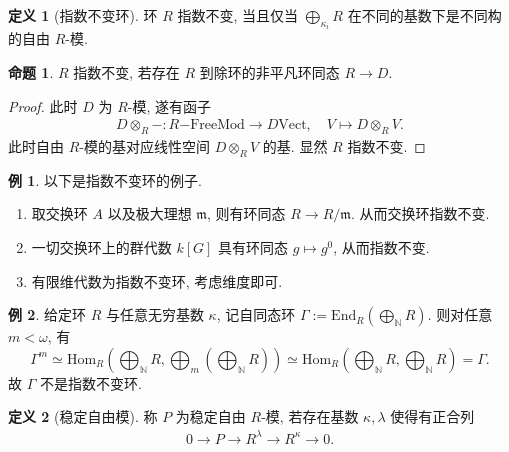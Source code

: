 \documentclass{MainStyle}
\theoremstyle{definition}
\newtheorem{example}{例}
\theoremstyle{definition}
\theoremstyle{definition}
\newtheorem{definition}{定义}
\theoremstyle{definition}
\newtheorem{proposition}{命题}
\theoremstyle{definition}
\theoremstyle{definition}
\theoremstyle{definition}
\theoremstyle{remark}
\theoremstyle{remark}
\begin{document}
\begin{definition}[指数不变环]
    环 $R$ 指数不变, 当且仅当 $\bigoplus_{\kappa_i}R$ 在不同的基数下是不同构的自由 $R$-模.
\end{definition}

\begin{proposition}
    $R$ 指数不变, 若存在 $R$ 到除环的非平凡环同态 $R\to D$.
    \begin{proof}
        此时 $D$ 为 $R$-模, 遂有函子
        \begin{align*}
            D\otimes_R-:R\mathrm{-FreeMod}\to D\mathrm{Vect},\quad
            V\mapsto D\otimes_R V.
        \end{align*}
        此时自由 $R$-模的基对应线性空间 $D\otimes_RV$ 的基. 显然 $R$ 指数不变.
    \end{proof}
\end{proposition}

\begin{example}
    以下是指数不变环的例子.
    \begin{enumerate}
        \item 取交换环 $A$ 以及极大理想 $\mathfrak m$, 则有环同态 $R\to R/\mathfrak m$. 从而交换环指数不变.
        \item 一切交换环上的群代数 $k[G]$ 具有环同态 $g\mapsto g^0$, 从而指数不变.
        \item 有限维代数为指数不变环, 考虑维度即可.
    \end{enumerate}
\end{example}

\begin{example}
    给定环 $R$ 与任意无穷基数 $\kappa$, 记自同态环 $\Gamma:=\mathrm{End}_R\left(\bigoplus_{\mathbb N}R\right)$. 则对任意 $m<\omega$, 有
    \begin{equation}
        \Gamma^m\simeq\mathrm{Hom}_R\left(\bigoplus_{\mathbb N}R,\bigoplus_{m}\left(\bigoplus_{\mathbb N}R\right)\right)\simeq \mathrm{Hom}_R\left(\bigoplus_{\mathbb N}R,\bigoplus_{\mathbb N}R\right)=\Gamma.
    \end{equation}
    故 $\Gamma$ 不是指数不变环.
\end{example}

\begin{definition}[稳定自由模]
    称 $P$ 为稳定自由 $R$-模, 若存在基数 $\kappa, \lambda$ 使得有正合列
    \begin{align}
        0\to P\to R^\lambda\to R^\kappa\to 0.
    \end{align}
\end{definition}
\end{document}
